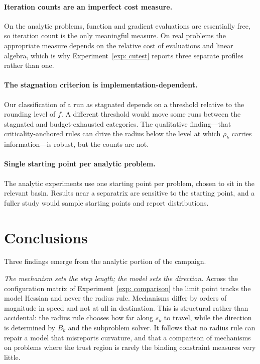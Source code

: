 \documentclass[11pt]{article}
\theoremstyle{plain}
\theoremstyle{definition}
\theoremstyle{remark}
\numberwithin{equation}{section}
\begin{document}
\paragraph{Iteration counts are an imperfect cost measure.}
On the analytic problems, function and gradient evaluations are essentially free, so iteration
count is the only meaningful measure. On real problems the appropriate measure depends on the
relative cost of evaluations and linear algebra, which is why Experiment~\ref{exp: cutest}
reports three separate profiles rather than one.

\paragraph{The stagnation criterion is implementation-dependent.}
Our classification of a run as stagnated depends on a threshold relative to the rounding level
of $f$. A different threshold would move some runs between the stagnated and budget-exhausted
categories. The qualitative finding---that criticality-anchored rules can drive the radius below
the level at which $\rho_k$ carries information---is robust, but the counts are not.

\paragraph{Single starting point per analytic problem.}
The analytic experiments use one starting point per problem, chosen to sit in the relevant
basin. Results near a separatrix are sensitive to the starting point, and a fuller study would
sample starting points and report distributions.

\section{Conclusions}
\label{sec: conclusions}

Three findings emerge from the analytic portion of the campaign.

\emph{The mechanism sets the step length; the model sets the direction.} Across the
configuration matrix of Experiment~\ref{exp: comparison} the limit point tracks the model
Hessian and never the radius rule. Mechanisms differ by orders of magnitude in speed and not at
all in destination. This is structural rather than accidental: the radius rule chooses how far
along $s_k$ to travel, while the direction is determined by $B_k$ and the subproblem solver.
It follows that no radius rule can repair a model that misreports curvature, and that a
comparison of mechanisms on problems where the trust region is rarely the binding constraint
measures very little.
\end{document}
